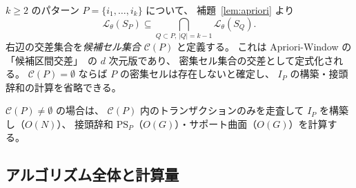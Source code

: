 $k \geq 2$ のパターン $P = \{i_1, \ldots, i_k\}$ について、
補題~\ref{lem:apriori} より
\begin{equation}\label{eq:candidate_cells}
  \mathcal{L}_\theta(S_P)
  \subseteq \bigcap_{Q \subset P,\, |Q|=k-1} \mathcal{L}_\theta(S_Q).
\end{equation}
右辺の交差集合を\emph{候補セル集合} $\mathcal{C}(P)$ と定義する。
これは Apriori-Window の「候補区間交差」~\cite{aprioriwindow}の $d$ 次元版であり、
密集セル集合の交差として定式化される。
$\mathcal{C}(P) = \emptyset$ ならば $P$ の密集セルは存在しないと確定し、
$I_P$ の構築・接頭辞和の計算を省略できる。

$\mathcal{C}(P) \neq \emptyset$ の場合は、
$\mathcal{C}(P)$ 内のトランザクションのみを走査して $I_P$ を構築し（$O(N)$）、
接頭辞和 $\mathrm{PS}_P$（$O(G)$）・サポート曲面（$O(G)$）を計算する。

\subsection{アルゴリズム全体と計算量}\label{sec:complexity}

